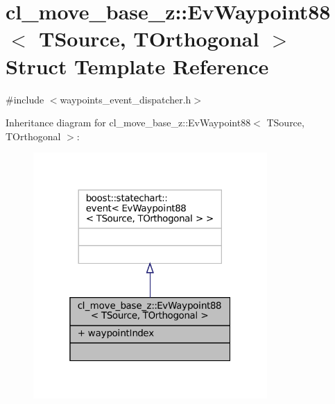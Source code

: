 \hypertarget{structcl__move__base__z_1_1EvWaypoint88}{}\section{cl\+\_\+move\+\_\+base\+\_\+z\+:\+:Ev\+Waypoint88$<$ T\+Source, T\+Orthogonal $>$ Struct Template Reference}
\label{structcl__move__base__z_1_1EvWaypoint88}


{\ttfamily \#include $<$waypoints\+\_\+event\+\_\+dispatcher.\+h$>$}



Inheritance diagram for cl\+\_\+move\+\_\+base\+\_\+z\+:\+:Ev\+Waypoint88$<$ T\+Source, T\+Orthogonal $>$\+:
\nopagebreak
\begin{figure}[H]
\begin{center}
\leavevmode
\includegraphics[width=253pt]{structcl__move__base__z_1_1EvWaypoint88__inherit__graph}
\end{center}
\end{figure}


